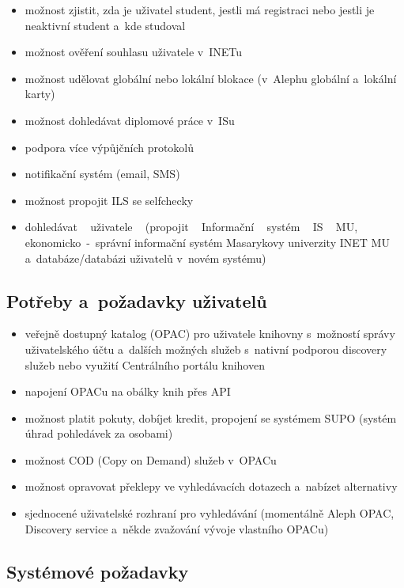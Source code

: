 \documentclass[
	11pt, oneside, printed, final, palatino
	microtype,
	table,   %
	lof,     %
	lot     %
]{fithesis3}
\begin{document}
{\begin{itemize}
\item možnost zjistit, zda je uživatel student, jestli má registraci nebo jestli je neaktivní student a~kde studoval
\item možnost ověření souhlasu uživatele v~INETu
\item možnost udělovat globální nebo lokální blokace (v~Alephu globální a~lokální karty)
\item možnost dohledávat diplomové práce v~ISu
\item podpora více výpůjčních protokolů
\item notifikační systém (email, SMS)
\item možnost propojit ILS se selfchecky
\item dohledávat ~ uživatele ~ (propojit ~ Informační ~ systém ~ IS ~ MU, ~ \\ekonomicko~-~správní informační systém Masarykovy univerzity INET MU a~databáze/databázi uživatelů v~novém systému)
\end{itemize}

\subsection{Potřeby a~požadavky uživatelů}

\begin{itemize}
\item veřejně dostupný katalog (OPAC) pro uživatele knihovny s~možností správy uživatelského účtu a~dalších možných služeb s~nativní podporou discovery služeb nebo využití Centrálního portálu knihoven
\item napojení OPACu na obálky knih přes API 
\item možnost platit pokuty, dobíjet kredit, propojení se systémem SUPO (systém úhrad pohledávek za osobami)
\item možnost COD (Copy on Demand) služeb v~OPACu
\item možnost opravovat překlepy ve vyhledávacích dotazech a~nabízet alternativy
\item sjednocené uživatelské rozhraní pro vyhledávání (momentálně Aleph OPAC, Discovery service a~někde zvažování vývoje vlastního OPACu)
\end{itemize}

\subsection{Systémové požadavky}

}
\end{document}
